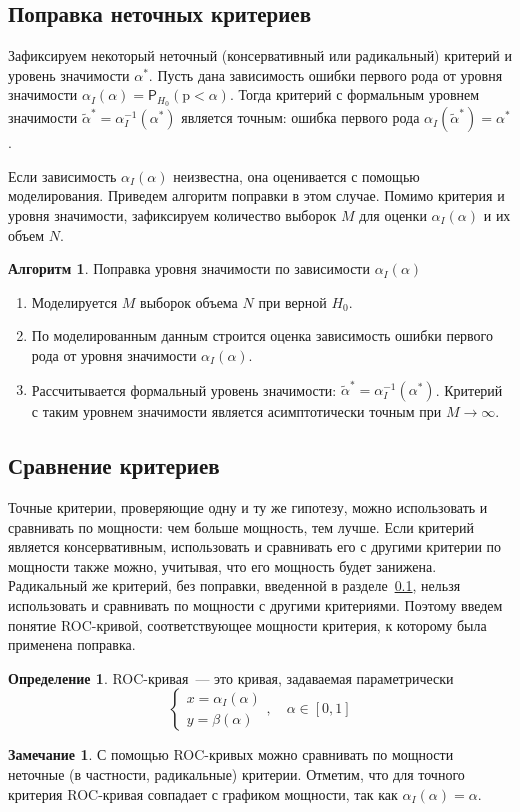 \documentclass[specialist,
substylefile = spbu_report.rtx,
subf,href,colorlinks=true, 12pt]{disser}
\theoremstyle{definition}
\newtheorem{definition}{Определение}[chapter]
\newtheorem{algorithm}{Алгоритм}
\newtheorem{remark}{Замечание}[chapter]
\begin{document}
\subsection{Поправка неточных критериев}\label{sect:correction}
Зафиксируем некоторый неточный (консервативный или радикальный) критерий и уровень значимости $\alpha^*$. Пусть дана зависимость ошибки первого рода от уровня значимости $\alpha_I(\alpha)=\mathsf P_{H_0}(\mathrm p < \alpha)$. Тогда критерий с формальным уровнем значимости $\widetilde\alpha^*=\alpha_I^{-1}(\alpha^*)$ является точным: ошибка первого рода $\alpha_I(\widetilde\alpha^*)=\alpha^*$.

Если зависимость $\alpha_I(\alpha)$ неизвестна, она оценивается с помощью моделирования. Приведем алгоритм поправки в этом случае. Помимо критерия и уровня значимости, зафиксируем количество выборок $M$ для оценки $\alpha_I(\alpha)$ и их объем $N$.
\begin{algorithm}{Поправка уровня значимости по зависимости $\alpha_I(\alpha)$}~\cite{Larin2022}\label{alg:correction}
	\begin{enumerate}
		\item Моделируется $M$ выборок объема $N$ при верной $H_0$.
		\item По моделированным данным строится оценка зависимость ошибки первого рода от уровня значимости $\alpha_I(\alpha)$.
		\item Рассчитывается формальный уровень значимости: $\widetilde{\alpha}^*=\alpha_I^{-1}(\alpha^*)$. Критерий с таким уровнем значимости является асимптотически точным при $M\to\infty$.
	\end{enumerate}
\end{algorithm}

\subsection{Сравнение критериев}
Точные критерии, проверяющие одну и ту же гипотезу, можно использовать и сравнивать по мощности: чем больше мощность, тем лучше. Если критерий является консервативным, использовать и сравнивать его с другими критерии по мощности также можно, учитывая, что его мощность будет занижена. Радикальный же критерий, без поправки, введенной в разделе~\ref{sect:correction}, нельзя использовать и сравнивать по мощности с другими критериями. Поэтому введем понятие ROC-кривой, соответствующее мощности критерия, к которому была применена поправка.
\begin{definition}
	ROC-кривая~--- это кривая, задаваемая параметрически
	\[
		\begin{cases}
			x=\alpha_I(\alpha) \\
			y=\beta(\alpha)
		\end{cases},\quad \alpha\in[0,1]
	\]
\end{definition}
\begin{remark}
	С помощью ROC-кривых можно сравнивать по мощности неточные (в частности, радикальные) критерии. Отметим, что для точного критерия ROC-кривая совпадает с графиком мощности, так как $\alpha_I(\alpha)=\alpha$.
\end{remark}
\end{document}
